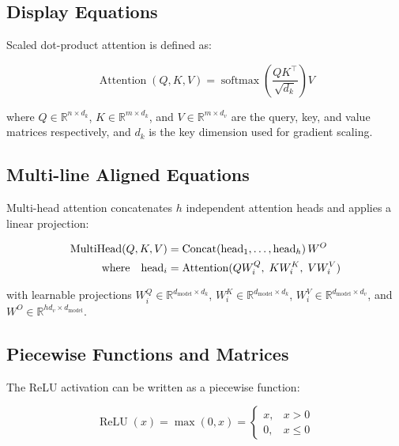 \documentclass[opendfm]{xlance/xlance}
\begin{document}
\subsection{Display Equations}

Scaled dot-product attention \cite{vaswani2017attention} is defined as:

\begin{equation}
    \operatorname{Attention}(Q, K, V)
    = \operatorname{softmax}\!\left(\frac{QK^{\top}}{\sqrt{d_k}}\right) V
    \label{eq:attention}
\end{equation}

where $Q \in \mathbb{R}^{n \times d_k}$, $K \in \mathbb{R}^{m \times d_k}$, and $V \in \mathbb{R}^{m \times d_v}$ are the query, key, and value matrices respectively, and $d_k$ is the key dimension used for gradient scaling.

\subsection{Multi-line Aligned Equations}

Multi-head attention concatenates $h$ independent attention heads and applies a linear projection:

\begin{align}
    \operatorname{MultiHead}(Q, K, V)
    &= \operatorname{Concat}(\mathrm{head}_1, \ldots, \mathrm{head}_h)\, W^O
    \label{eq:multihead} \\
    \text{where}\quad \mathrm{head}_i
    &= \operatorname{Attention}(Q W_i^Q,\; K W_i^K,\; V W_i^V)
    \notag
\end{align}

with learnable projections $W_i^Q \in \mathbb{R}^{d_{\mathrm{model}} \times d_k}$, $W_i^K \in \mathbb{R}^{d_{\mathrm{model}} \times d_k}$, $W_i^V \in \mathbb{R}^{d_{\mathrm{model}} \times d_v}$, and $W^O \in \mathbb{R}^{h d_v \times d_{\mathrm{model}}}$.

\subsection{Piecewise Functions and Matrices}

The ReLU activation can be written as a piecewise function:

\begin{equation}
    \operatorname{ReLU}(x) = \max(0, x) =
    \begin{cases}
        x, & x > 0 \\
        0, & x \leq 0
    \end{cases}
    \label{eq:relu}
\end{equation}
\end{document}
